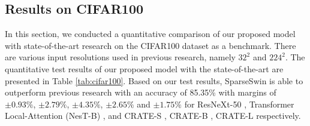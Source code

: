 \documentclass[runningheads]{llncs}
\begin{document}
\begin{table}[tp]
\extracolsep{\fill}
\def\arraystretch{1.25}\centering
\large
\caption{Quantitative Comparison on CIFAR10}
\label{tab:cifar10}
\end{table}

\subsection{Results on CIFAR100}
\label{sec:cifar100}
In this section, we conducted a quantitative comparison of our proposed model with state-of-the-art research on the CIFAR100 dataset as a benchmark. There are various input resolutions used in previous research, namely $32^2$ and $224^2$. The quantitative test results of our proposed model with the state-of-the-art are presented in Table \ref{tab:cifar100}. Based on our test results, SparseSwin is able to outperform previous research with an accuracy of 85.35\% with margins of $\pm 0.93\%$, $\pm 2.79\%$, $\pm 4.35\%$, $\pm 2.65\%$ and $\pm 1.75\%$ for ResNeXt-50 \cite{DBLP:journals/corr/XieGDTH16} , Transformer Local-Attention (NesT-B) \cite{zhang2022nested}, and CRATE-S \cite{yu2023white}, CRATE-B \cite{yu2023white}, CRATE-L \cite{yu2023white} respectively.
\end{document}
